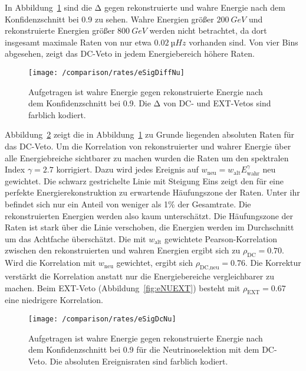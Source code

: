 In Abbildung~\ref{fig:eDiff} sind die $\mathrm{Δ}$  gegen rekonstruierte und wahre Energie nach dem Konfidenzschnitt bei 0.9 zu sehen.
Wahre Energien größer $\SI{200}{GeV}$ und rekonstruierte Energien größer $\SI{800}{GeV}$ werden nicht betrachtet, da dort insgesamt maximale Raten von nur etwa $\SI{0.02}{µHz}$ vorhanden sind.
Von vier Bins abgesehen, zeigt das DC-Veto in jedem Energiebereich höhere Raten.
\begin{figure}
\begin{center}
    \texttt{[image: /comparison/rates/eSigDiffNu]}
\end{center}
\vspace{-2em}
    \caption{Aufgetragen ist wahre Energie gegen rekonstruierte Energie nach dem Konfidenzschnitt bei 0.9. Die $\mathrm{Δ}$ von DC- und EXT-Vetos sind farblich kodiert.}
\label{fig:eDiff}
\end{figure}

Abbildung~\ref{fig:eNUDC} zeigt die in Abbildung~\ref{fig:eDiff} zu Grunde liegenden absoluten Raten für das DC-Veto.
Um die Korrelation von rekonstruierter und wahrer Energie über alle Energiebreiche sichtbarer zu machen wurden die Raten um den spektralen Index $\gamma= 2.7$ korrigiert.
Dazu wird jedes Ereignis auf $w_\text{neu} = w_\text{alt}E_\text{wahr}^\gamma$ neu gewichtet.
Die schwarz gestrichelte Linie mit Steigung Eins zeigt den für eine perfekte Energierekonstruktion zu erwartende Häufungszone der Raten.
Unter ihr befindet sich nur ein Anteil von weniger als 1\% der Gesamtrate.
Die rekonstruierten Energien werden also kaum unterschätzt.
Die Häufungszone der Raten ist stark über die Linie verschoben, die Energien werden im Durchschnitt um das Achtfache überschätzt.
Die mit $w_\text{alt}$ gewichtete Pearson-Korrelation zwischen den rekonstruierten und wahren Energien ergibt sich zu $\rho_\text{DC} = 0.70$.
Wird die Korrelation mit $w_\text{neu}$ gewichtet, ergibt sich $\rho _\text{DC,neu} = 0.76$. 
Die Korrektur verstärkt die Korrelation anstatt nur die Energiebereiche vergleichbarer zu machen.
Beim EXT-Veto (Abbildung~\ref{fig:eNUEXT}) besteht mit $\rho_\text{EXT} = 0.67$ eine niedrigere Korrelation.
\begin{figure}
\begin{center}
    \texttt{[image: /comparison/rates/eSigDcNu]}
\end{center}
\vspace{-2em}
    \caption{Aufgetragen ist wahre Energie gegen rekonstruierte Energie nach dem Konfidenzschnitt bei 0.9 für die Neutrinoselektion mit dem DC-Veto. Die absoluten Ereignisraten sind farblich kodiert.}
\label{fig:eNUDC}
\end{figure}



